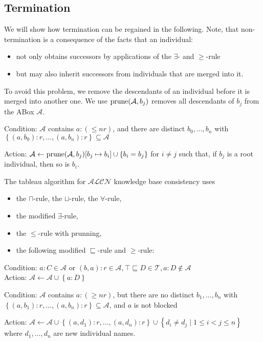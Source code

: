\subsection*{Termination}
We will show how termination can be regained in the following.
Note, that non-termination is a consequence of the facts that an individual:
\begin{itemize}
	\item not only obtains successors by applications of the $\exists$- and $ \geq$-rule
	\item but may also inherit successors from individuals that are merged into it.
\end{itemize}

To avoid this problem, we remove the descendants of an individual before it is merged into another one.
We use $\operatorname{\text{prune}}(\mathcal{A},b_j)$ removes all descendants of $b_j$ from the ABox $\mathcal{A}$.
\begin{mdframed}[frametitle= The $ \leq$-rule with prunning]
	Condition: $\mathcal{A}$ contains $a:( \leq nr)$, and there are distinct
	$b_0, \ldots, b_n$ with $\left\{ (a,b_0):r, \ldots, (a,b_n):r \right\} \subseteq \mathcal{A}$

	Action: $\mathcal{A} \leftarrow \operatorname{\text{prune}}(\mathcal{A}, b_j)[b_j \mapsto b_i] \cup \left\{ b_i = b_j \right\}$
	for $i \neq j$ such that, if $b_j$ is a root individual, then so is $b_i$.
\end{mdframed}

The tableau algorithm for $\mathcal{ALCN}$ knowledge base consistency uses
\begin{itemize}
	\item the $\sqcap$-rule, the $\sqcup$-rule, the $\forall$-rule,
	\item the modified $\exists$-rule,
	\item the $ \leq$-rule with prunning,
	\item the following modified $\sqsubseteq$-rule and $ \geq$-rule:
\end{itemize}
\begin{mdframed}[frametitle= The modified $\sqsubseteq$-rule, nobreak = true]
	Condition: $a : C \in \mathcal{A}$ or $ (b,a):r \in \mathcal{A}, \top \sqsubseteq D \in \mathcal{T}, a : D \notin \mathcal{A}$\\
	Action: $\mathcal{A} \leftarrow \mathcal{A} \cup \left\{ a: D \right\}$
\end{mdframed}
\begin{mdframed}[frametitle= The modified $ \geq$-rule, nobreak = true]
	Condition: $\mathcal{A}$ contains $a:( \geq nr)$, but there are no distinct
	$b_1, \ldots, b_n$ with $\left\{ (a,b_1):r, \ldots, (a,b_n):r \right\} \subseteq \mathcal{A}$,
	and $a$ is not blocked

	Action: $\mathcal{A} \leftarrow \mathcal{A} \cup \left\{ (a,d_1):r, \ldots, (a,d_n):r \right\} \cup \left\{ d_i \neq d_j \mid 1 \leq i < j \leq n \right\}$
	where $d_1, \ldots, d_n$ are new individual names.
\end{mdframed}

